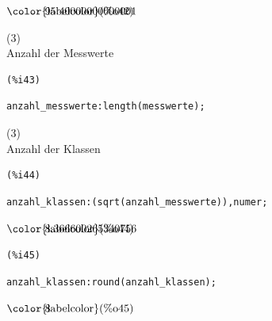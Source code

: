 \documentclass[12pt]{article}
\begin{document}
\begin{math}\displaystyle
\parbox{8ex}{\color{labelcolor}(\%o42) }
95.40000000000001
\end{math}

(3) \\
Anzahl der Messwerte

\noindent
\begin{minipage}[t]{8ex}{\color{red}\bf
\begin{verbatim}
(%i43) 
\end{verbatim}}
\end{minipage}
\begin{minipage}[t]{\textwidth}{\color{blue}
\begin{verbatim}
anzahl_messwerte:length(messwerte);
\end{verbatim}}
\end{minipage}


(3) \\
Anzahl der Klassen

\noindent
\begin{minipage}[t]{8ex}{\color{red}\bf
\begin{verbatim}
(%i44) 
\end{verbatim}}
\end{minipage}
\begin{minipage}[t]{\textwidth}{\color{blue}
\begin{verbatim}
anzahl_klassen:(sqrt(anzahl_messwerte)),numer;
\end{verbatim}}
\end{minipage}
\begin{math}\displaystyle
\parbox{8ex}{\color{labelcolor}(\%o44) }
8.366600265340756
\end{math}


\noindent
\begin{minipage}[t]{8ex}{\color{red}\bf
\begin{verbatim}
(%i45) 
\end{verbatim}}
\end{minipage}
\begin{minipage}[t]{\textwidth}{\color{blue}
\begin{verbatim}
anzahl_klassen:round(anzahl_klassen);
\end{verbatim}}
\end{minipage}
\begin{math}\displaystyle
\parbox{8ex}{\color{labelcolor}(\%o45) }
8
\end{math}
\end{document}
